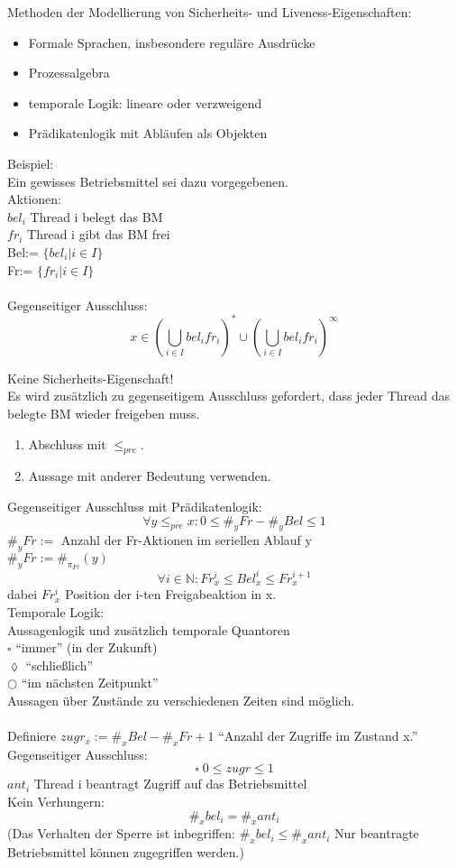 \documentclass[a4paper,12pt]{scrartcl}
\begin{document}
 Methoden der Modellierung von Sicherheits- und Liveness-Eigenschaften:
 \begin{itemize}
  \item Formale Sprachen, insbesondere reguläre Ausdrücke
  \item Prozessalgebra
  \item temporale Logik: lineare oder verzweigend
  \item Prädikatenlogik mit Abläufen als Objekten
 \end{itemize}

 Beispiel:\\
 Ein gewisses Betriebsmittel sei dazu vorgegebenen.\\
 Aktionen:\\
 $bel_i$ Thread i belegt das BM\\
 $fr_i$ Thread i gibt das BM frei\\
 Bel:= $\{bel_i|i\in I\}$\\
 Fr:= $\{fr_i|i\in I\}$\\
 \\
 Gegenseitiger Ausschluss:
 $$x\in(\bigcup_{i\in I} bel_i fr_i)^*  \cup (\bigcup_{i\in I} bel_i fr_i)^\infty $$
 
 Keine Sicherheits-Eigenschaft!\\
 Es wird zusätzlich zu gegenseitigem Ausschluss gefordert, dass jeder Thread das belegte BM wieder freigeben muss.\\
 \begin{enumerate}
  \item Abschluss mit $\leq_{pre}$.
  \item Aussage mit anderer Bedeutung verwenden.
 \end{enumerate}

 
 Gegenseitiger Ausschluss mit Prädikatenlogik:
 $$\forall y \leq_{pre} x: 0\leq \#_yFr-\#_yBel\leq 1 $$
 $\#_y Fr:=$ Anzahl der Fr-Aktionen im seriellen Ablauf y\\
 $\#_y Fr:=\#_{\pi_{Fr}}(y)$
 $$\forall i\in \mathbb{N}: Fr^i_x\leq Bel_x^i\leq Fr_x^{i+1} $$
 dabei $Fr^i_x$ Position der i-ten Freigabeaktion in x.\\
 Temporale Logik:\\
 Aussagenlogik und zusätzlich temporale Quantoren\\
 $\square$ "`immer"' (in der Zukunft)\\
 $\lozenge$ "`schließlich"'\\
 $\bigcirc$ "`im nächsten Zeitpunkt"'\\
 Aussagen über Zustände zu verschiedenen Zeiten sind möglich.\\
 \\
 Definiere $zugr_x:=\#_xBel-\#_xFr+1$ "`Anzahl der Zugriffe im Zustand x."'\\
 Gegenseitiger Ausschluss:
 $$\square\; 0\leq zugr \leq 1 $$
$ant_i$ Thread i beantragt Zugriff auf das Betriebsmittel\\
Kein Verhungern:
$$\#_x bel_i = \#_x ant_i $$
(Das Verhalten der Sperre ist inbegriffen: $\#_x bel_i \leq \#_x ant_i$ Nur beantragte Betriebsmittel können zugegriffen werden.)
\end{document}
